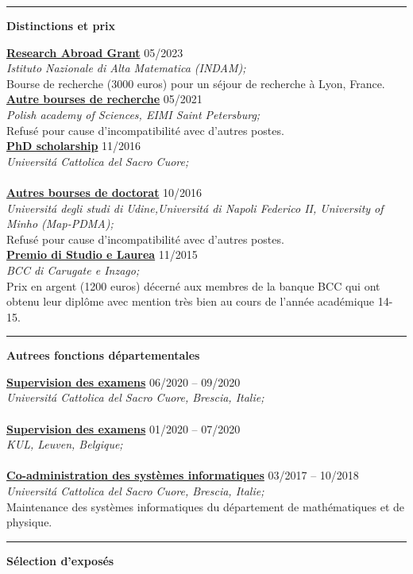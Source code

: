 \documentclass[a4paper]{article}
\newcommand{\block}[1]{\hrule \vspace{0.2cm} \textbf{\Large #1} \vspace{0.2cm}}
\newcommand{\voice}[5]{\href{#4}{\textbf{#1}} \hfill #2 \\ \textit{#3} \\ {\small #5} \vspace{0.2cm} \\}
\begin{document}
        




    \block{Distinctions et prix}

    
    \voice{Research Abroad Grant}
        {05/2023}
        {Istituto Nazionale di Alta Matematica (INDAM);}
        {https://www.altamatematica.it/wp-content/uploads/2022/12/bando-estero-20/202223-1.pdf}       
        {Bourse de recherche (3000 euros) pour un séjour de recherche à Lyon, France.}
    \voice{Autre bourses de recherche}
        {05/2021}
        {Polish academy of Sciences, EIMI Saint Petersburg;}
        {}       
        {Refusé pour cause d'incompatibilité avec d'autres postes.}
    \voice{PhD scholarship}
        {11/2016}
        {Universit\'a Cattolica del Sacro Cuore;}
        {https://www.dropbox.com/s/pmsg20xsxd6x5yf/External_Scholarship.pdf?dl=0}       
        {\vspace{-0.5cm}}
    \voice{Autres bourses de doctorat}
        {10/2016}
        {Universit\'a degli studi di Udine,Universit\'a di Napoli Federico II, University of Minho (Map-PDMA);}
        {}       
        {Refusé pour cause d'incompatibilité avec d'autres postes.}
    \voice{Premio di Studio e Laurea}
        {11/2015}
        {BCC di Carugate e Inzago;}
        {https://web.archive.org/web/20191207203437/https://www.bccmilano.it/news/dettaglio_news_div.asp?i_menuID=54872&hNewsID=132411}       
        {Prix en argent (1200 euros) décerné aux membres de la banque BCC qui ont obtenu leur diplôme avec mention très bien au cours de l'année académique 14-15.}

   
   
    \block{Autrees fonctions départementales}

    
    \voice{Supervision des examens}
        {06/2020 -- 09/2020}
        {Universit\'a Cattolica del Sacro Cuore, Brescia, Italie;}
        {}       
        {\vspace{-0.5cm}}
    \voice{Supervision des examens}
        {01/2020 -- 07/2020}
        {KUL, Leuven, Belgique;}
        {}       
        {\vspace{-0.5cm}}
    \voice{Co-administration des systèmes informatiques}
        {03/2017 -- 10/2018}
        {Universit\'a Cattolica del Sacro Cuore, Brescia, Italie;}
        {https://dipartimenti.unicatt.it/dmf-home}       
        {Maintenance des systèmes informatiques du département de mathématiques et de physique.}   
        


    \block{Sélection d'exposés}
\end{document}
